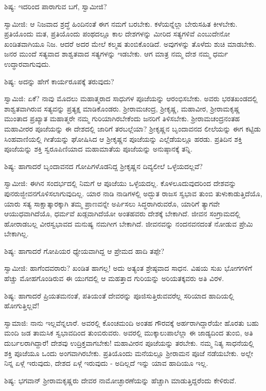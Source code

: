 ಶಿಷ್ಯ: ಇದರಿಂದ ಪಾರಾಗುವ ಬಗೆ, ಸ್ವಾಮೀಜಿ?

ಸ್ವಾಮೀಜಿ: ಆ ನಿಜವಾದ ಶ್ರದ್ಧೆ ಹಿಂದಿನಂತೆ ಈಗ ನಮಗೆ ಬರಬೇಕು. ಕಳೆಯನ್ನೆಲ್ಲಾ ಬೇರುಸಹಿತ ಕೀಳಬೇಕು. ಪ್ರತಿಯೊಂದು ಮತ, ಪ್ರತಿಯೊಂದು ಪಂಥದಲ್ಲೂ ಕಾಲ ದೇಶಗಳನ್ನು ಮೀರಿದ ಸತ್ಯಗಳಿವೆ ಎಂಬುದೇನೋ ಖಂಡಿತವಾಗಿಯೂ ನಿಜ. ಆದರೆ ಅದರ ಮೇಲೆ ಕಲ್ಮಷ ತುಂಬಿಕೊಂಡಿದೆ. ಅವುಗಳನ್ನು ತೊಳೆದು ಶುಚಿ ಮಾಡಬೇಕು. ಜನರ ಮುಂದೆ ಸತ್ಯವಾದ ಶಾಶ್ವತವಾದ ಸತ್ಯಗಳನ್ನು ಇಡಬೇಕು. ಆಗ ಮಾತ್ರ ನಮ್ಮ ದೇಶ ನಮ್ಮ ಧರ್ಮ ಉದ್ಧಾರವಾಗುವುದು.

ಶಿಷ್ಯ: ಅದನ್ನು ಹೇಗೆ ಕಾರ್ಯರೂಪಕ್ಕೆ ತರುವುದು?

ಸ್ವಾಮಿಜಿ: ಏಕೆ? ನಾವು ಮೊದಲು ಮಹಾತ್ಮರಾದ ಸಾಧುಗಳ ಪೂಜೆಯನ್ನು ಆರಂಭಿಸಬೇಕು. ಅವರು ಭರತಖಂಡದಲ್ಲಿ ಶಾಶ್ವತವಾಗಿರುವ ಸತ್ಯವನ್ನು ಪ್ರತ್ಯಕ್ಷ ಮಾಡಿಕೊಂಡರು. ಶ‍್ರೀರಾಮಚಂದ್ರ, ಶ‍್ರೀಕೃಷ್ಣ, ಮಹಾವೀರ, ಶ‍್ರೀರಾಮಕೃಷ್ಣ ಮುಂತಾದ ಪ್ರಖ್ಯಾತ ಮಹಾತ್ಮರೇ ನಮ್ಮ ಗುರಿಯಾಗಿರಬೇಕೆಂದು ಜನರಿಗೆ ತಿಳಿಸಬೇಕು. ಶ‍್ರೀರಾಮಚಂದ್ರನಂತಹ ಮಹಾವೀರರ ಪೂಜೆಯನ್ನು ಈ ದೇಶದಲ್ಲಿ ಜಾರಿಗೆ ತರಬಲ್ಲೆಯಾ? ಶ‍್ರೀಕೃಷ್ಣನ ಬೃಂದಾವನದ ಲೀಲೆಯನ್ನು ಈಗ ಕಟ್ಟಿಡು ಸಿಂಹವಾಣಿಯಲ್ಲಿ ಗೀತೆಯನ್ನು ಘೋಷಿಸಿದ ಆ ಶ‍್ರೀಕೃಷ್ಣನ ಪೂಜೆಯನ್ನು ಎಲ್ಲೆಡೆಯಲ್ಲೂ ಹರಡು. ಪ್ರತಿದಿನ ಶಕ್ತಿ ಪೂಜೆಯನ್ನು ಶಕ್ತಿ ಸ್ವರೂಪಿಣಿಯಾದ ಮಹಾಮಾತೆಯ ಪೂಜೆಯನ್ನು ಅನುಷ್ಠಾನಕ್ಕೆ ತನ್ನಿ.

ಶಿಷ್ಯ: ಹಾಗಾದರೆ ಬೃಂದಾವನದ ಗೋಪಿಗಳೊಡನಿದ್ದ ಶ‍್ರೀಕೃಷ್ಣನ ದಿವ್ಯಲೀಲೆ ಒಳ್ಳೆಯದಲ್ಲವೆ?

ಸ್ವಾಮೀಜಿ: ಈಗಿನ ಸಂದರ್ಭದಲ್ಲಿ ನಿಮಗೆ ಆ ಪೂಜೆಯು ಒಳ್ಳೆಯದಲ್ಲ. ಕೊಳಲೂದುವುದರಿಂದ ದೇಶವನ್ನು ಪುನರುಜ್ಜೀವನಗೊಳಿಸಲಾಗುವುದಿಲ್ಲ. ಯಾರ ನಾಡಿ ನಾಡಿಗಳಲ್ಲಿ ಅದ್ಭುತ ರಾಜಸ ಸ್ವಭಾವ ತುಂಬಿ ತುಳುಕಾಡುತ್ತಿದೆಯೊ, ಯಾರು ಸತ್ಯ ಸಾಕ್ಷಾತ್ಕಾರಕ್ಕಾಗಿ ತಮ್ಮ ಪ್ರಾಣವನ್ನೇ ಅರ್ಪಿಸಲು ಸಿದ್ಧರಾಗಿರುವರೊ, ಯಾರಿಗೆ ತ್ಯಾಗವೇ ಆಯುಧವಾಗಿದೆಯೊ, ಧರ್ಮವೆ ಖಡ್ಗವಾಗಿದೆಯೋ ಅಂತಹವರು ದೇಶಕ್ಕೆ ಬೇಕಾಗಿದೆ. ಜೀವನ ಸಂಗ್ರಾಮದಲ್ಲಿ ಹೋರಾಡಬಲ್ಲ ವೀರಸ್ವಭಾವದ ಮನುಷ್ಯ ನಮಗೀಗ ಬೇಕಾಗಿದೆ. ಜೀವನವನ್ನು ನಂದನವನದಂತೆ ನೋಡುವ ಪ್ರೇಮಿ ಬೇಕಾಗಿಲ್ಲ.

ಶಿಷ್ಯ: ಹಾಗಾದರೆ ಗೋಪಿಯರ ಧ್ಯೇಯವಾಗಿದ್ದ ಆ ಪ್ರೇಮದ ಹಾದಿ ತಪ್ಪೇ?

ಸ್ವಾಮೀಜಿ: ಹಾಗೆಂದವರಾರು? ಖಂಡಿತ ಹಾಗಲ್ಲ! ಅದು ಅತ್ಯಂತ ಶ್ರೇಷ್ಠವಾದ ಸಾಧನ. ವಿಷಯ ಸುಖ ಭೋಗಗಳಿಗೆ ಹೆಚ್ಚು ಮೋಹಗೊಂಡಿರುವ ಈ ಯುಗದಲ್ಲಿ ಆ ಮಹತ್ತಾದ ಗುರಿಯನ್ನು ಅರಿಯತಕ್ಕವರು ಅತಿ ವಿರಳ.

ಶಿಷ್ಯ: ಹಾಗಾದರೆ ಪ್ರಿಯತಮನಂತೆ, ಪತಿಯಂತೆ ದೇವರನ್ನು ಪೂಜಿಸುತ್ತಿರುವವರೆಲ್ಲ ಸರಿಯಾದ ಹಾದಿಯಲ್ಲಿ ಹೋಗುತ್ತಿಲ್ಲವೆ!

ಸ್ವಾಮಾಜಿ: ನಾನು ಇಲ್ಲವೆನ್ನಲಾರೆ. ಅವರಲ್ಲಿ ಕೊಂಚಮಂದಿ ಅಂತಹ ಗೌರವಕ್ಕೆ ಅರ್ಹರಾಗಿದ್ದಾರೆಯೇ ಹೊರತು ಬಹು ಮಂದಿ ಜಡ ತಾಮಸಿಕ ಸ್ವಭಾವದಿಂದ ತುಂಬಿರುವರು. ಅವರಲ್ಲಿ ಮುಕ್ಕಾಲುಪಾಲೆಲ್ಲಾ ಈ ಜಾಡ್ಯದಿಂದ ತುಂಬಿ, ಅತಿ ದುರ್ಬಲರಾಗಿದ್ದಾರೆ! ದೇಶವು ಉದ್ರಿಕ್ತವಾಗಬೇಕು! ಮಹಾವೀರನ ಪೂಜೆಯನ್ನು ತರಬೇಕು. ನಮ್ಮ ನಿತ್ಯ ಸಾಧನೆಯಲ್ಲಿ ಶಕ್ತಿ ಪೂಜೆಯೂ ಒಂದು ಅಂಗವಾಗಿರಬೇಕು. ಪ್ರತಿಯೊಂದು ಮನೆಯಲ್ಲೂ ಶ‍್ರೀರಾಮನ ಪೂಜೆ ನಡೆಯಬೇಕು. ಅಲ್ಲೇ ನಿನ್ನ ಏಳ್ಗೆ ಇರುವುದು, ದೇಶದ ಏಳ್ಗೆ ಇರುವುದು - ಅದಿಲ್ಲದೆ ಇನ್ನು ಯಾವ ಹಾದಿಯೂ ಇಲ್ಲ.

ಶಿಷ್ಯ: ಭಗವಾನ್ ಶ‍್ರೀರಾಮಕೃಷ್ಣರು ದೇವರ ನಾಮೋಚ್ಛಾರಣೆಯನ್ನು ಹೆಚ್ಚಾಗಿ ಮಾಡುತ್ತಿದ್ದರೆಂದು ಕೇಳಿರುವೆ.

